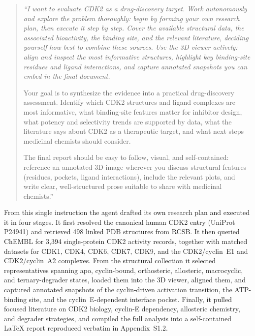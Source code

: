 \documentclass[journal=jcisd8,manuscript=article]{achemso}
\begin{document}
\begin{quote}\itshape
``I want to evaluate CDK2 as a drug-discovery target. Work autonomously and explore the problem thoroughly: begin by forming your own research plan, then execute it step by step. Cover the available structural data, the associated bioactivity, the binding site, and the relevant literature, deciding yourself how best to combine these sources. Use the 3D viewer actively: align and inspect the most informative structures, highlight key binding-site residues and ligand interactions, and capture annotated snapshots you can embed in the final document.

Your goal is to synthesize the evidence into a practical drug-discovery assessment. Identify which CDK2 structures and ligand complexes are most informative, what binding-site features matter for inhibitor design, what potency and selectivity trends are supported by data, what the literature says about CDK2 as a therapeutic target, and what next steps medicinal chemists should consider.

The final report should be easy to follow, visual, and self-contained: reference an annotated 3D image wherever you discuss structural features (residues, pockets, ligand interactions), include the relevant plots, and write clear, well-structured prose suitable to share with medicinal chemists.''
\end{quote}

From this single instruction the agent drafted its own research plan and executed it in four stages. It first resolved the canonical human CDK2 entry (UniProt P24941) and retrieved 498 linked PDB structures from RCSB. It then queried ChEMBL for 3{,}394 single-protein CDK2 activity records, together with matched datasets for CDK1, CDK4, CDK6, CDK7, CDK9, and the CDK2/cyclin~E1 and CDK2/cyclin~A2 complexes. From the structural collection it selected representatives spanning apo, cyclin-bound, orthosteric, allosteric, macrocyclic, and ternary-degrader states, loaded them into the 3D viewer, aligned them, and captured annotated snapshots of the cyclin-driven activation transition, the ATP-binding site, and the cyclin~E-dependent interface pocket. Finally, it pulled focused literature on CDK2 biology, cyclin-E dependency, allosteric chemistry, and degrader strategies, and compiled the full analysis into a self-contained LaTeX report reproduced verbatim in Appendix~S1.2.
\end{document}
